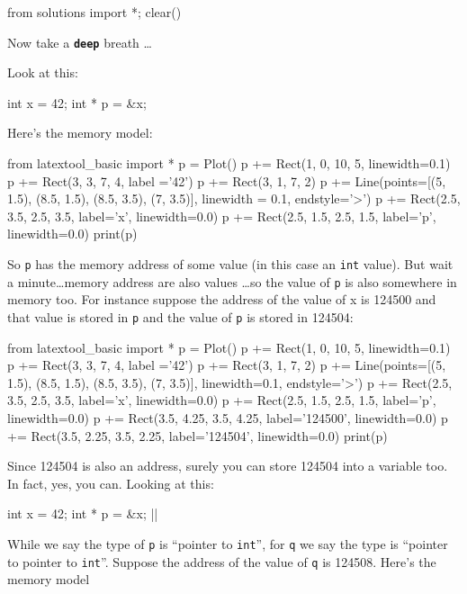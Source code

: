 \begin{python0}
from solutions import *; clear()
\end{python0}

Now take a \texttt{\textbf{deep}} breath \ldots

Look at this:

\begin{consolethree}[escapeinside=||]
int x = 42;
int * p = &x;
\end{consolethree}
Here's the memory model:

\begin{python}
from latextool_basic import *
p = Plot()
p += Rect(1, 0, 10, 5, linewidth=0.1)
p += Rect(3, 3, 7, 4, label ='42')
p += Rect(3, 1, 7, 2)
p += Line(points=[(5, 1.5), (8.5, 1.5), (8.5, 3.5), (7, 3.5)], linewidth = 0.1, endstyle='>')
p += Rect(2.5, 3.5, 2.5, 3.5, label='x', linewidth=0.0)
p += Rect(2.5, 1.5, 2.5, 1.5, label='p', linewidth=0.0)
print(p)
\end{python}

So \texttt{p} has the memory address of some value (in this case an \texttt{int} value). But wait a minute\ldots memory address are also values \ldots so the value of \texttt{p} is also somewhere in memory too. For instance suppose the address of the value of x is 124500 and that value is stored in \texttt{p} and the value of \texttt{p} is stored in 124504:

\begin{python}
from latextool_basic import *
p = Plot()
p += Rect(1, 0, 10, 5, linewidth=0.1)
p += Rect(3, 3, 7, 4, label ='42')
p += Rect(3, 1, 7, 2)
p += Line(points=[(5, 1.5), (8.5, 1.5), (8.5, 3.5), (7, 3.5)], linewidth=0.1, endstyle='>')
p += Rect(2.5, 3.5, 2.5, 3.5, label='x', linewidth=0.0)
p += Rect(2.5, 1.5, 2.5, 1.5, label='p', linewidth=0.0)
p += Rect(3.5, 4.25, 3.5, 4.25, label='124500', linewidth=0.0)
p += Rect(3.5, 2.25, 3.5, 2.25, label='124504', linewidth=0.0)
print(p)
\end{python}

Since 124504 is also an address, surely you can store 124504 into a variable too. In fact, yes, you can. Looking at this:

\begin{consolethree}[escapeinside=||]
int x = 42;
int * p = &x;
||
\end{consolethree}
While we say the type of \texttt{p} is ``pointer to \texttt{int}'', for \texttt{q} we say the type is ``pointer to pointer to \texttt{int}''. Suppose the address of the value of \texttt{q} is 124508. Here's the memory model

